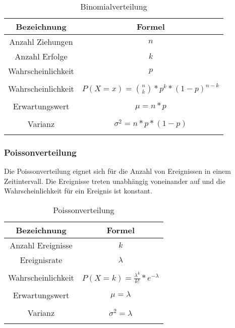 \documentclass[12pt]{scrartcl}
\begin{document}
\begin{table}[h]
    \begin{tabular}{ | c | c | }
        \hline
        Bezeichnung        & Formel                                      \\
        \hline
        Anzahl Ziehungen   & $n$                                         \\
        Anzahl Erfolge     & $k$                                         \\
        Wahrscheinlichkeit & $p$                                         \\
        \hline             &                                             \\
        Wahrscheinlichkeit & $P(X=x) = \binom{n}{k} * p^k * (1-p)^{n-k}$ \\&\\
        Erwartungswert     & $\mu = n * p$                               \\&\\
        Varianz            & $\sigma^2 = n*p*(1-p)$                      \\&\\
        \hline
    \end{tabular}
    \caption{Binomialverteilung}
\end{table}

\subsubsection{Poissonverteilung}

Die Poissonverteilung eignet sich für die Anzahl von Ereignissen in einem Zeitintervall.
Die Ereignisse treten unabhängig voneinander auf und die Wahrscheinlichkeit für ein Ereignis ist konstant.

\begin{table}[h]
    \begin{tabular}{ | c | c | }
        \hline
        Bezeichnung        & Formel                                         \\
        \hline
        Anzahl Ereignisse  & $k$                                            \\
        Ereignisrate       & $\lambda$                                      \\

        \hline             &                                                \\
        Wahrscheinlichkeit & $P(X=k) = \frac{\lambda^k}{k!} * e^{-\lambda}$ \\&\\
        Erwartungswert     & $\mu = \lambda$                                \\&\\
        Varianz            & $\sigma^2 = \lambda$                           \\&\\
        \hline
    \end{tabular}
    \caption{Poissonverteilung}
\end{table}
\end{document}
